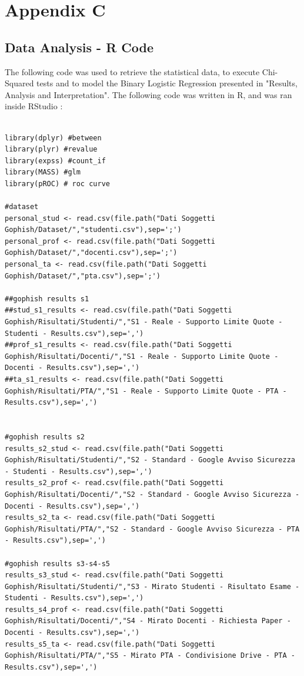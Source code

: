\documentclass[a4paper]{article}
\begin{document}
\newpage

\section*{Appendix C}

\subsection*{Data Analysis - R Code}

The following code was used to retrieve the statistical data, to execute Chi-Squared tests and to model the Binary Logistic Regression presented in "Results, Analysis and Interpretation". The following code was written in R, and was ran inside RStudio \cite{tools-rstudio}:

\begin{lstlisting}
   
library(dplyr) #between
library(plyr) #revalue
library(expss) #count_if
library(MASS) #glm
library(pROC) # roc curve

#dataset
personal_stud <- read.csv(file.path("Dati Soggetti Gophish/Dataset/","studenti.csv"),sep=';')
personal_prof <- read.csv(file.path("Dati Soggetti Gophish/Dataset/","docenti.csv"),sep=';')
personal_ta <- read.csv(file.path("Dati Soggetti Gophish/Dataset/","pta.csv"),sep=';')

##gophish results s1
##stud_s1_results <- read.csv(file.path("Dati Soggetti Gophish/Risultati/Studenti/","S1 - Reale - Supporto Limite Quote - Studenti - Results.csv"),sep=',')
##prof_s1_results <- read.csv(file.path("Dati Soggetti Gophish/Risultati/Docenti/","S1 - Reale - Supporto Limite Quote - Docenti - Results.csv"),sep=',')
##ta_s1_results <- read.csv(file.path("Dati Soggetti Gophish/Risultati/PTA/","S1 - Reale - Supporto Limite Quote - PTA - Results.csv"),sep=',')


#gophish results s2
results_s2_stud <- read.csv(file.path("Dati Soggetti Gophish/Risultati/Studenti/","S2 - Standard - Google Avviso Sicurezza - Studenti - Results.csv"),sep=',')
results_s2_prof <- read.csv(file.path("Dati Soggetti Gophish/Risultati/Docenti/","S2 - Standard - Google Avviso Sicurezza - Docenti - Results.csv"),sep=',')
results_s2_ta <- read.csv(file.path("Dati Soggetti Gophish/Risultati/PTA/","S2 - Standard - Google Avviso Sicurezza - PTA - Results.csv"),sep=',')

#gophish results s3-s4-s5
results_s3_stud <- read.csv(file.path("Dati Soggetti Gophish/Risultati/Studenti/","S3 - Mirato Studenti - Risultato Esame - Studenti - Results.csv"),sep=',')
results_s4_prof <- read.csv(file.path("Dati Soggetti Gophish/Risultati/Docenti/","S4 - Mirato Docenti - Richiesta Paper - Docenti - Results.csv"),sep=',')
results_s5_ta <- read.csv(file.path("Dati Soggetti Gophish/Risultati/PTA/","S5 - Mirato PTA - Condivisione Drive - PTA - Results.csv"),sep=',')


\end{lstlisting}
\end{document}
